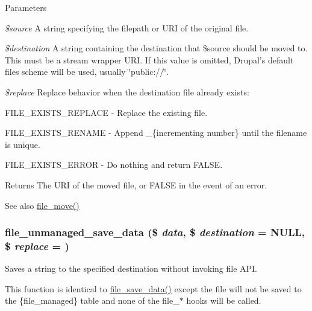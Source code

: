 \begin{DoxyParams}{Parameters}
\item[{\em \$source}]A string specifying the filepath or URI of the original file. \item[{\em \$destination}]A string containing the destination that \$source should be moved to. This must be a stream wrapper URI. If this value is omitted, Drupal's default files scheme will be used, usually \char`\"{}public://\char`\"{}. \item[{\em \$replace}]Replace behavior when the destination file already exists:
\begin{DoxyItemize}
\item FILE\_\-EXISTS\_\-REPLACE -\/ Replace the existing file.
\item FILE\_\-EXISTS\_\-RENAME -\/ Append \_\-\{incrementing number\} until the filename is unique.
\item FILE\_\-EXISTS\_\-ERROR -\/ Do nothing and return FALSE.
\end{DoxyItemize}\end{DoxyParams}
\begin{DoxyReturn}{Returns}
The URI of the moved file, or FALSE in the event of an error.
\end{DoxyReturn}
\begin{DoxySeeAlso}{See also}
\hyperlink{group__file_gad6f4eec44e0c32bf0cde6c602d5da38f}{file\_\-move()} 
\end{DoxySeeAlso}
\hypertarget{group__file_gac2d047d4471ec93803f584cda01a557c}{
\subsubsection[{file\_\-unmanaged\_\-save\_\-data}]{\setlength{\rightskip}{0pt plus 5cm}file\_\-unmanaged\_\-save\_\-data (\$ {\em data}, \/  \$ {\em destination} = {\ttfamily NULL}, \/  \$ {\em replace} = {})}}
\label{group__file_gac2d047d4471ec93803f584cda01a557c}
Saves a string to the specified destination without invoking file API.

This function is identical to \hyperlink{group__file_ga7a01611c7c08b91876d93431207dd9b0}{file\_\-save\_\-data()} except the file will not be saved to the \{file\_\-managed\} table and none of the file\_\-$\ast$ hooks will be called.


